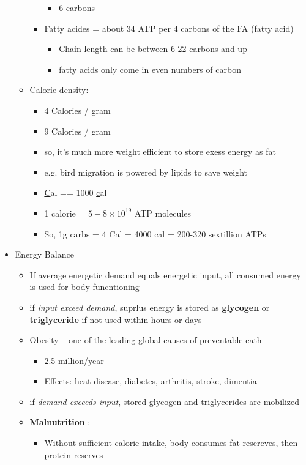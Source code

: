 \documentclass{article}
\theoremstyle{definition}
\begin{document}
\begin{itemize}
\begin{itemize}
\begin{itemize}
						\begin{itemize}
							\item 6 carbons
						\end{itemize}
					\item Fatty acides = about 34 ATP per 4 carbons of the FA (fatty acid)
						\begin{itemize}
							\item Chain length can be between 6-22 carbons and up
							\item fatty acids only come in even numbers of carbon
						\end{itemize}
				\end{itemize}
			\item Calorie density:
				\begin{itemize}
					\item 4 Calories / gram
					\item 9 Calories / gram
					\item so, it's much more weight efficient to store exess energy as fat
					\item e.g. bird migration is powered by lipids to save weight
					\item \underline{C}al == 1000 \underline{c}al
					\item 1 calorie = $5-8\times 10^{19}$ ATP molecules
					\item So, 1g carbs = 4 Cal = 4000 cal = 200-320 sextillion ATPs
				\end{itemize}
		\end{itemize}
	\item Energy Balance
		\begin{itemize}
			\item If average energetic demand equals energetic input, all consumed energy is used for body funcntioning
			\item if \textit{input exceed demand}, suprlus energy is stored as \textbf{glycogen}  or \textbf{triglyceride}  if not used within hours or days
			\item Obesity -- one of the leading global causes of preventable eath
				\begin{itemize}
					\item 2.5 million/year
					\item Effects: heat disease, diabetes, arthritis, stroke, dimentia
				\end{itemize}
			\item if \textit{demand exceeds input}, stored glycogen and triglycerides are mobilized
			\item \textbf{Malnutrition} :
				\begin{itemize}
					\item Without sufficient calorie intake, body consumes fat resereves, then protein reserves
				\end{itemize}
		\end{itemize}
\end{itemize}
\end{document}
